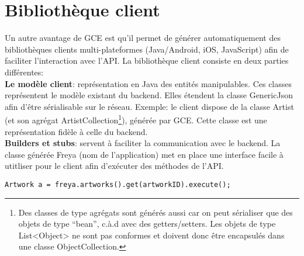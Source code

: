 \chapter{Bibliothèque client}

Un autre avantage de GCE est qu’il permet de générer automatiquement des
bibliothèques clients multi-plateformes (Java/Android, iOS, JavaScript) afin de
faciliter l’interaction avec l’API.
La bibliothèque client consiste en deux parties différentes:\\

\textbf{Le modèle client}: représentation en Java des entités manipulables. Ces
classes représentent le modèle existant du backend. Elles étendent la classe GenericJson
afin d’être sérialisable sur le réseau.
Exemple: le client dispose de la classe Artist (et son agrégat
ArtistCollection\footnote{Des classes de type agrégats sont générés aussi car on
peut sérialiser que des objets de type “bean”, c.à.d avec des getters/setters.
Les objets de type List<Object> ne sont pas conformes et doivent donc être
encapsulés dans une classe ObjectCollection.}), générée par GCE. Cette classe
est une représentation fidèle à celle du backend.\\

\textbf{Builders et stubs}: servent à faciliter la communication avec le
backend.
La classe générée Freya (nom de l’application) met en place une interface facile
à utitliser pour le client afin d’exécuter des méthodes de l’API.\\


\begin{adjustbox}{minipage=0.92\textwidth,margin=0pt \smallskipamount,center}
\begin{lstlisting}[style=Java, label=endpoints, caption=Exemple d'utilisation
de la bibliothèque client]
Artwork a = freya.artworks().get(artworkID).execute();
\end{lstlisting}
\end{adjustbox}